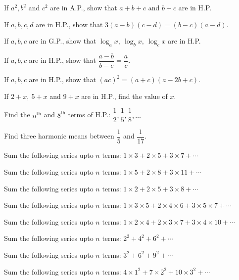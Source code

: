 \documentclass[11pt,a4paper]{article}
\begin{document}
\begin{shortlist}
\item If $a^2,b^2$ and $c^2$ are in A.P., show that $a+b+c$ and $b+c$ are in H.P.

\item If $a,b,c,d$ are in H.P., show that $3(a-b)(c-d)=(b-c)(a-d)$.

\item If $a,b,c$ are in G.P., show that $\log_a x,\ \log_b x,\ \log_c x$ are in H.P.

\item If $a,b,c$ are in H.P., show that $\dfrac{a-b}{b-c}=\dfrac{a}{c}$.

\item If $a,b,c$ are in H.P., show that $(ac)^2=(a+c)(a-2b+c)$.

\item If $2+x,\ 5+x$ and $9+x$ are in H.P., find the value of $x$.

\item Find the $n^{\text{th}}$ and $8^{\text{th}}$ terms of H.P.: $\dfrac{1}{2},\dfrac{1}{5},\dfrac{1}{8},\ldots$

\item Find three harmonic means between $\dfrac{1}{5}$ and $\dfrac{1}{17}$.

\item Sum the following series upto $n$ terms: $1\times 3+2\times 5+3\times 7+\cdots$

\item Sum the following series upto $n$ terms: $1\times 5+2\times 8+3\times 11+\cdots$

\item Sum the following series upto $n$ terms: $1\times 2+2\times 5+3\times 8+\cdots$

\item Sum the following series upto $n$ terms: $1\times 3\times 5+2\times 4\times 6+3\times 5\times 7+\cdots$

\item Sum the following series upto $n$ terms: $1\times 2\times 4+2\times 3\times 7+3\times 4\times 10+\cdots$

\item Sum the following series upto $n$ terms: $2^2+4^2+6^2+\cdots$

\item Sum the following series upto $n$ terms: $3^2+6^2+9^2+\cdots$

\item Sum the following series upto $n$ terms: $4\times 1^2+7\times 2^2+10\times 3^2+\cdots$


\end{shortlist}
\end{document}
